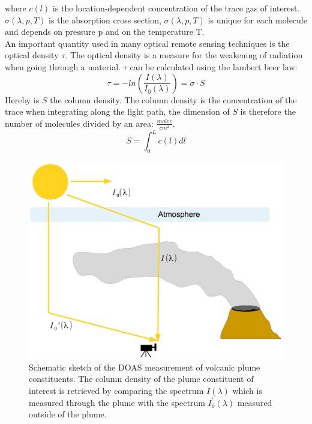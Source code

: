 \documentclass  [
  paper    = a4,
  BCOR     = 10mm,
  twoside,
  fontsize = 12pt,
  fleqn,
  toc      = bibnumbered,
  toc      = listofnumbered,
  numbers  = noendperiod,
  headings = normal,
  listof   = leveldown,
  version  = 3.03
]                                       {scrreprt}
\begin{document}
	where $c\left(l\right)$ is the location-dependent concentration of the trace gas of interest. $\sigma\left(\lambda,p,T\right)$ is the absorption cross section, $\sigma\left(\lambda,p,T\right)$ is unique for each molecule and depends on pressure p and on the temperature T.\\
	An important quantity used in many optical remote sensing techniques is the optical density $\tau$. The optical density is a measure for the weakening of radiation when going through a material. $\tau$ can be calculated using the lambert beer law:
	\begin{equation}
	\tau = -ln\left(\frac{I\left(\lambda\right)}{I_{0}\left(\lambda\right)}\right) = \sigma\cdot S
	\end{equation}
	Hereby is $S$ the column density. The column density is the concentration of the trace when integrating along the light path, the dimension of $S$ is therefore the number of molecules divided by an area: $\frac{molec}{cm^2}$.
	\begin{equation}
	S = \int_{0}^{L}c\left(l\right)dl
	\end{equation}
	\begin{figure}
		\centering
		\includegraphics[width=0.7\linewidth]{Bilder/DOASFunction}
		\caption{Schematic sketch of the DOAS measurement of volcanic plume constituents. The column density of the plume constituent of interest is retrieved by comparing the spectrum $I\left(\lambda \right)$ which is measured through the plume with the spectrum  $I_0^{'}\left(\lambda \right)$ measured outside of the plume.}
		\label{fig:doasfunction}
	\end{figure}
	
\end{document}
